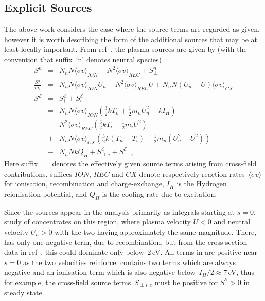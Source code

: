 \subsection{Explicit Sources}\label{sec:sources}
The above work considers the case where the source terms are regarded
as given, however it is worth describing the form of the additional sources that
may be at least locally important.
From ref~\cite{Ha13Benc}, the plasma sources are given by (with the convention that suffix~`n'
denotes neutral species)
\begin{eqnarray}
\label{eq:Sn} S^n&=&N_n N \langle\sigma v\rangle_{ION} - N^2 \langle\sigma v\rangle_{REC} +S^n_{\perp} \\
\label{eq:Su} \frac{S^u}{m_i} &=&N_n N \langle\sigma v\rangle_{ION} U_n - N^2 \langle\sigma v\rangle_{REC} U + N_n N (U_n-U) \langle\sigma v\rangle_{CX} \\
\label{eq:SE} S^\mathcal{E}&=&S^\mathcal{E}_i+S^\mathcal{E}_e \\
&=&N_n N \langle\sigma v\rangle_{ION} (\frac{3}{2} kT_n + \frac{1}{2} m_n U_n^2 -k I_H)\\
\nonumber &-& N^2 \langle\sigma v\rangle_{REC} (\frac{3}{2} kT_i + \frac{1}{2} m_i U^2 )\\
\nonumber &+&N_n N\langle\sigma v\rangle_{CX} \left(\frac{3}{2} k (T_n-T_i)  + \frac{1}{2} m_n (U_n^2-U^2)\right)\\
\nonumber &-&N_n N k Q_H +S^\mathcal{E}_{\perp i} +S^\mathcal{E}_{\perp e}
 \end{eqnarray}
Here suffix $\perp$ denotes the effectively given source terms arising from cross-field
contributions, suffices $ION$,
$REC$ and $CX$ denote respectively reaction rates~$\langle\sigma v\rangle$ for ionisation,
recombination and charge-exchange, $I_H$ is the Hydrogen reionisation potential,
and $Q_H$ is the cooling rate due to excitation. 

Since the sources appear in the analysis primarily as integrals starting at $s=0$,
study of  concentrates on this region, where plasma velocity $U<0$ and neutral velocity $U_n>0$
with the two having approximately the same magnitude. There,  has only one negative
term, due to recombination, but from the cross-section data in ref~\cite{Ha13Benc}, this could
dominate only below~$2$\,eV. All terms in  are positive near $s=0$ as the two velocities
reinforce.  contains two terms which are always negative and an ionisation
term which is also negative below~$I_H/2\approx7$\,eV, thus for example, the cross-field source
terms~$S_{\perp i,e}$  must be positive for $S^\mathcal{E}>0$ in steady state.

